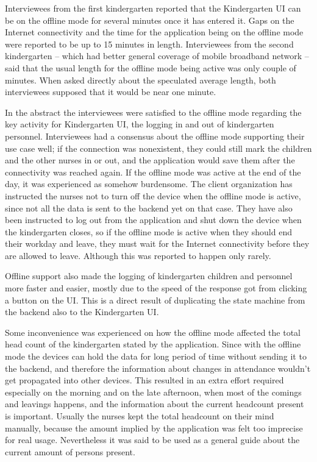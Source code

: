 Interviewees from the first kindergarten reported that the Kindergarten UI can be on the offline mode for several minutes once it has entered it. Gaps on the Internet connectivity and the time for the application being on the offline mode were reported to be up to 15 minutes in length. Interviewees from the second kindergarten – which had better general coverage of mobile broadband network – said that the usual length for the offline mode being active was only couple of minutes. When asked directly about the speculated average length, both interviewees supposed that it would be near one minute.

In the abstract the interviewees were satisfied to the offline mode regarding the key activity for Kindergarten UI, the logging in and out of kindergarten personnel. Interviewees had a consensus about the offline mode supporting their use case well; if the connection was nonexistent, they could still mark the children and the other nurses in or out, and the application would save them after the connectivity was reached again. If the offline mode was active at the end of the day, it was experienced as somehow burdensome. The client organization has instructed the nurses not to turn off the device when the offline mode is active, since not all the data is sent to the backend yet on that case. They have also been instructed to log out from the application and shut down the device when the kindergarten closes, so if the offline mode is active when they should end their workday and leave, they must wait for the Internet connectivity before they are allowed to leave. Although this was reported to happen only rarely.

Offline support also made the logging of kindergarten children and personnel more faster and easier, mostly due to the speed of the response got from clicking a button on the UI. This is a direct result of duplicating the state machine from the backend also to the Kindergarten UI. 

Some inconvenience was experienced on how the offline mode affected the total head count of the kindergarten stated by the application. Since with the offline mode the devices can hold the data for long period of time without sending it to the backend, and therefore the information about changes in attendance wouldn't get propagated into other devices. This resulted in an extra effort required especially on the morning and on the late afternoon, when most of the comings and leavings happens, and the information about the current headcount present is important. Usually the nurses kept the total headcount on their mind manually, because the amount implied by the application was felt too imprecise for real usage. Nevertheless it was said to be used as a general guide about the current amount of persons present.

